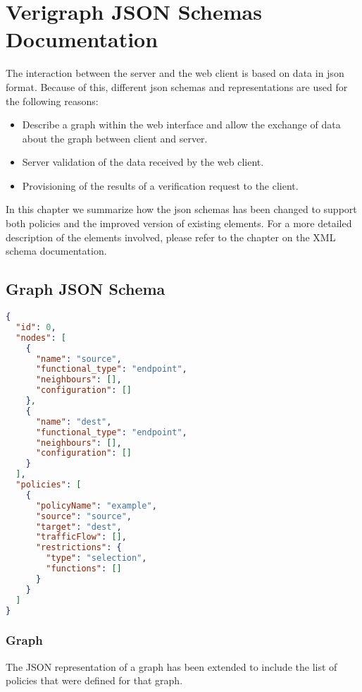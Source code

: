 \section{Verigraph JSON Schemas Documentation}

The interaction between the server and the web client is based on data in json format. Because of this, different json schemas and representations are used for the following reasons:
\begin{itemize}
 \item Describe a graph within the web interface and allow the exchange of data about the graph between client and server. 
 \item Server validation of the data received by the web client.
 \item Provisioning of the results of a verification request to the client.
\end{itemize}

In this chapter we summarize how the json schemas has been changed to support both policies and the improved version of existing elements. For a more detailed description of the elements involved, please refer to the chapter on the XML schema documentation.

\subsection{Graph JSON Schema}

\begin{lstlisting}[language=JSON, caption=JSON Example]
{
  "id": 0,
  "nodes": [
    {
      "name": "source",
      "functional_type": "endpoint",
      "neighbours": [],
      "configuration": []
    },
    {
      "name": "dest",
      "functional_type": "endpoint",
      "neighbours": [],
      "configuration": []
    }
  ],
  "policies": [
    {
      "policyName": "example",
      "source": "source",
      "target": "dest",
      "trafficFlow": [],
      "restrictions": {
        "type": "selection",
        "functions": []
      }
    }
  ]
}
\end{lstlisting}

\subsubsection*{Graph}
The JSON representation of a graph has been extended to include the list of policies that were defined for that graph.

